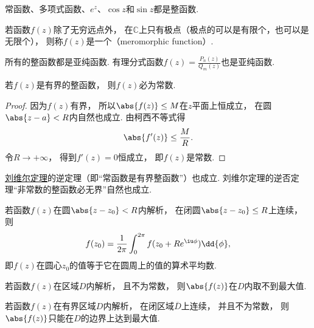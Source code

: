 \begin{example}
常函数、多项式函数、\(e^z\)、\(\cos z\)和\(\sin z\)都是整函数.
\end{example}

\begin{definition}
若函数\(f(z)\)除了无穷远点外，
在\(\mathbb{C}\)上只有极点（极点的可以是有限个，也可以是无限个），
则称\(f(z)\)是一个（meromorphic function）.
\end{definition}

\begin{example}
所有的整函数都是亚纯函数.
有理分式函数\(f(z) = \frac{P_n(z)}{Q_m(z)}\)也是亚纯函数.
\end{example}

\begin{theorem}[刘维尔定理]\label{theorem:解析函数的积分表示.刘维尔定理}
若\(f(z)\)是有界的整函数，
则\(f(z)\)必为常数.
\begin{proof}
因为\(f(z)\)有界，
所以\(\abs{f(z)} \leq M\)在\(z\)平面上恒成立，
在圆\(\abs{z-a}<R\)内自然也成立.
由柯西不等式得\[
	\abs{f'(z)} \leq \frac{M}{R}.
\]
令\(R\to+\infty\)，
得到\(f'(z)=0\)恒成立，
即\(f(z)\)是常数.
\end{proof}
\end{theorem}
\hyperref[theorem:解析函数的积分表示.刘维尔定理]{刘维尔定理}的逆定理（即“常函数是有界整函数”）也成立.
刘维尔定理的逆否定理“非常数的整函数必无界”自然也成立.

\begin{theorem}[解析函数的平均值定理]\label{theorem:解析函数的积分表示.平均值定理}
若函数\(f(z)\)在圆\(\abs{z-z_0}<R\)内解析，
在闭圆\(\abs{z-z_0} \leq R\)上连续，
则\[
	f(z_0)
	= \frac{1}{2\pi} \int_0^{2\pi} f(z_0+Re^{\iu\phi}) \dd{\phi},
\]
即\(f(z)\)在圆心\(z_0\)的值等于它在圆周上的值的算术平均数.
\end{theorem}

\begin{theorem}[最大模定理]\label{theorem:解析函数的积分表示.最大模定理}
若函数\(f(z)\)在区域\(D\)内解析，
且不为常数，
则\(\abs{f(z)}\)在\(D\)内取不到最大值.
\end{theorem}

\begin{corollary}\label{theorem:解析函数的积分表示.最大模定理推论}
若函数\(f(z)\)在有界区域\(D\)内解析，
在闭区域\(\overline{D}\)上连续，
并且不为常数，
则\(\abs{f(z)}\)只能在\(D\)的边界上达到最大值.
\end{corollary}
